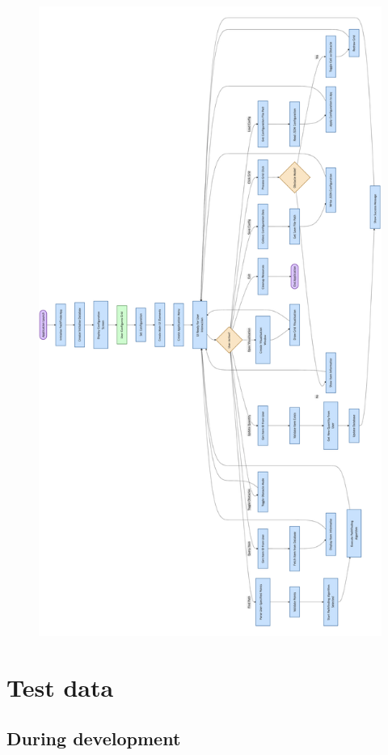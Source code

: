 \begin{figure}[htbp!]
    \centering
    \includegraphics[width=0.7\linewidth]{Flowcharts/Unified.png}

\end{figure}

\newpage

\section{Test data}

\subsection{During development}

